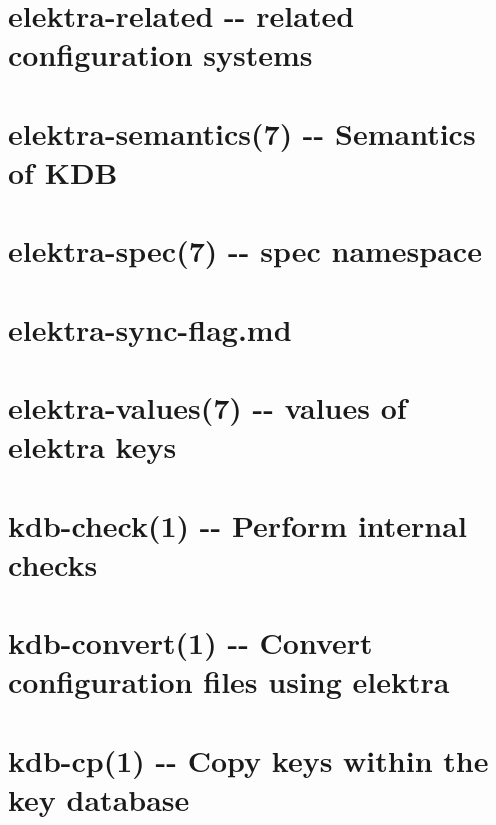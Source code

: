 \documentclass[twoside]{book}
\newcommand{\+}{\discretionary{\mbox{\scriptsize$\hookleftarrow$}}{}{}}
\begin{document}
\chapter{elektra-\/related -\/-\/ related configuration systems}
\label{md_doc_help_elektra-related}
\hypertarget{md_doc_help_elektra-related}{}

\chapter{elektra-\/semantics(7) -\/-\/ Semantics of K\+D\+B}
\label{md_doc_help_elektra-semantics}
\hypertarget{md_doc_help_elektra-semantics}{}

\chapter{elektra-\/spec(7) -\/-\/ spec namespace}
\label{md_doc_help_elektra-spec}
\hypertarget{md_doc_help_elektra-spec}{}

\chapter{elektra-\/sync-\/flag.md}
\label{doc_help_elektra-sync-flag_md}
\hypertarget{doc_help_elektra-sync-flag_md}{}

\chapter{elektra-\/values(7) -\/-\/ values of elektra keys}
\label{md_doc_help_elektra-values}
\hypertarget{md_doc_help_elektra-values}{}

\chapter{kdb-\/check(1) -\/-\/ Perform internal checks}
\label{md_doc_help_kdb-check}
\hypertarget{md_doc_help_kdb-check}{}

\chapter{kdb-\/convert(1) -\/-\/ Convert configuration files using elektra}
\label{md_doc_help_kdb-convert}
\hypertarget{md_doc_help_kdb-convert}{}

\chapter{kdb-\/cp(1) -\/-\/ Copy keys within the key database}
\label{md_doc_help_kdb-cp}
\hypertarget{md_doc_help_kdb-cp}{}

\end{document}
